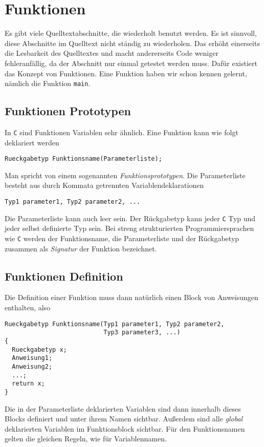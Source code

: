 \section{Funktionen}

Es gibt viele Quelltextabschnitte, die wiederholt benutzt werden.
Es ist sinnvoll, diese Abschnitte im Quelltext nicht ständig zu wiederholen.
Das erhöht einerseits die Lesbarkeit des Quelltextes und macht andererseits Code weniger fehleranfällig, da der Abschnitt nur einmal getestet werden muss.
Dafür existiert das Konzept von Funktionen.
Eine Funktion haben wir schon kennen gelernt, nämlich die Funktion \verb|main|. 

\subsection{Funktionen Prototypen}

In \texttt{C} sind Funktionen Variablen sehr ähnlich.
Eine Funktion kann wie folgt deklariert werden
\begin{lstlisting}
Rueckgabetyp Funktionsname(Parameterliste);
\end{lstlisting}
Man spricht von einem sogenannten \emph{Funktionsprototypen}.
Die Parameterliste besteht aus durch Kommata getrennten Variablendeklarationen
\begin{lstlisting}
Typ1 parameter1, Typ2 parameter2, ...
\end{lstlisting}
Die Parameterliste kann auch leer sein.
Der Rückgabetyp kann jeder \texttt{C} Typ und jeder selbst definierte Typ sein.
Bei streng strukturierten Programmiersprachen wie \texttt{C} werden der Funktionsname, die Parameterliste und der Rückgabetyp zusammen als \emph{Signatur} der Funktion bezeichnet.

\subsection{Funktionen Definition}

Die Definition einer Funktion muss dann natürlich einen Block von Anweisungen enthalten, also
\begin{lstlisting}[caption={Funktionen Prototyp}, belowcaptionskip=0.3em]
Rueckgabetyp Funktionsname(Typ1 parameter1, Typ2 parameter2,
                           Typ3 parameter3, ...)
{
  Rueckgabetyp x;
  Anweisung1;
  Anweisung2;
  ...;
  return x;
}
\end{lstlisting}
Die in der Parameterliste deklarierten Variablen sind dann innerhalb dieses Blocks definiert und unter ihrem Namen sichtbar.
Außerdem sind alle \emph{global} deklarierten Variablen im Funktionsblock sichtbar.
Für den Funktionsnamen gelten die gleichen Regeln, wie für Variablennamen.

